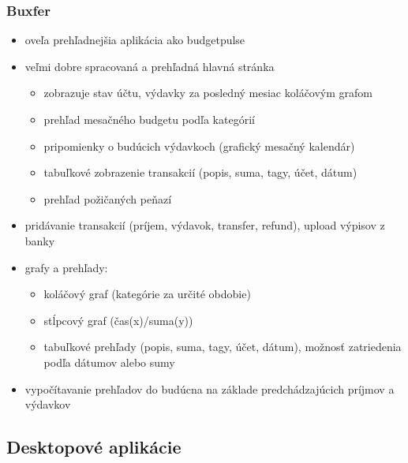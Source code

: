 \documentclass[12pt,onesided]{book}
\begin{document}
\subsubsection{Buxfer \cite{Buxfer}\ }
\begin{itemize}
\item{oveľa prehľadnejšia aplikácia ako budgetpulse}
\item{veľmi dobre spracovaná a prehľadná hlavná stránka}
\begin{itemize}
\item{zobrazuje stav účtu, výdavky za posledný mesiac koláčovým grafom}
\item{prehľad mesačného budgetu podľa kategórií}
\item{pripomienky o budúcich výdavkoch (grafický mesačný kalendár)}
\item{tabuľkové zobrazenie transakcií (popis, suma, tagy, účet, dátum)}
\item{prehľad požičaných peňazí}
\end{itemize}
\item{pridávanie transakcií (príjem, výdavok, transfer, refund), upload výpisov z banky}
\item{grafy a prehľady:}
\begin{itemize}
\item{koláčový graf (kategórie za určité obdobie)}
\item{stĺpcový graf (čas(x)/suma(y))}
\item{tabuľkové prehľady (popis, suma, tagy, účet, dátum), možnosť zatriedenia podľa dátumov alebo sumy}
\end{itemize}
\item{vypočítavanie prehľadov do budúcna na základe predchádzajúcich príjmov a výdavkov}
\end{itemize}


\subsection{Desktopové aplikácie}
\end{document}
